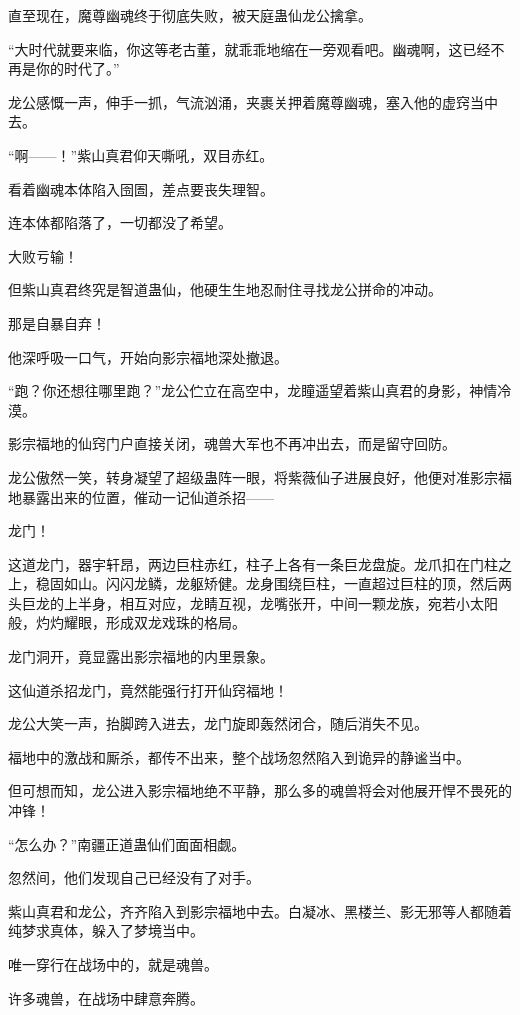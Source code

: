 \begin{this_body}
直至现在，魔尊幽魂终于彻底失败，被天庭蛊仙龙公擒拿。

“大时代就要来临，你这等老古董，就乖乖地缩在一旁观看吧。幽魂啊，这已经不再是你的时代了。”

龙公感慨一声，伸手一抓，气流汹涌，夹裹关押着魔尊幽魂，塞入他的虚窍当中去。

“啊——！”紫山真君仰天嘶吼，双目赤红。

看着幽魂本体陷入囹圄，差点要丧失理智。

连本体都陷落了，一切都没了希望。

大败亏输！

但紫山真君终究是智道蛊仙，他硬生生地忍耐住寻找龙公拼命的冲动。

那是自暴自弃！

他深呼吸一口气，开始向影宗福地深处撤退。

“跑？你还想往哪里跑？”龙公伫立在高空中，龙瞳遥望着紫山真君的身影，神情冷漠。

影宗福地的仙窍门户直接关闭，魂兽大军也不再冲出去，而是留守回防。

龙公傲然一笑，转身凝望了超级蛊阵一眼，将紫薇仙子进展良好，他便对准影宗福地暴露出来的位置，催动一记仙道杀招——

龙门！

这道龙门，器宇轩昂，两边巨柱赤红，柱子上各有一条巨龙盘旋。龙爪扣在门柱之上，稳固如山。闪闪龙鳞，龙躯矫健。龙身围绕巨柱，一直超过巨柱的顶，然后两头巨龙的上半身，相互对应，龙睛互视，龙嘴张开，中间一颗龙族，宛若小太阳般，灼灼耀眼，形成双龙戏珠的格局。

龙门洞开，竟显露出影宗福地的内里景象。

这仙道杀招龙门，竟然能强行打开仙窍福地！

龙公大笑一声，抬脚跨入进去，龙门旋即轰然闭合，随后消失不见。

福地中的激战和厮杀，都传不出来，整个战场忽然陷入到诡异的静谧当中。

但可想而知，龙公进入影宗福地绝不平静，那么多的魂兽将会对他展开悍不畏死的冲锋！

“怎么办？”南疆正道蛊仙们面面相觑。

忽然间，他们发现自己已经没有了对手。

紫山真君和龙公，齐齐陷入到影宗福地中去。白凝冰、黑楼兰、影无邪等人都随着纯梦求真体，躲入了梦境当中。

唯一穿行在战场中的，就是魂兽。

许多魂兽，在战场中肆意奔腾。


\end{this_body}
